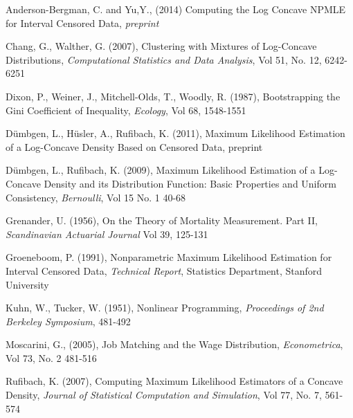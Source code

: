 \documentclass[11pt]{article}
\numberwithin{equation}{section}
\begin{document}
\vspace{3mm}

Anderson-Bergman, C. and Yu,Y.,  (2014) Computing the Log Concave NPMLE for Interval Censored Data, \emph{preprint}

\vspace{3mm}


Chang, G., Walther, G. (2007), Clustering with Mixtures of Log-Concave Distributions, \emph{Computational Statistics and Data Analysis}, Vol 51, No. 12, 6242-6251

\vspace{3mm}

Dixon, P., Weiner, J., Mitchell-Olds, T., Woodly, R. (1987), Bootstrapping the Gini Coefficient of Inequality, \emph{Ecology}, Vol 68, 1548-1551

\vspace{3mm}

D\"umbgen, L., H\"usler, A., Rufibach, K. (2011), Maximum Likelihood Estimation of a Log-Concave Density Based on Censored Data, preprint

\vspace{3mm}

D\"umbgen, L., Rufibach, K. (2009), Maximum Likelihood Estimation of a Log-Concave Density and its Distribution Function: Basic Properties and Uniform Consistency, \emph{Bernoulli}, Vol 15 No. 1 40-68

\vspace{3mm}

Grenander, U. (1956), On the Theory of Mortality Measurement. Part II, \emph{Scandinavian Actuarial Journal} Vol 39, 125-131

\vspace{3mm}

Groeneboom, P. (1991), Nonparametric Maximum Likelihood Estimation for Interval Censored Data, \emph{Technical Report}, Statistics Department, Stanford University

\vspace{3mm}

Kuhn, W., Tucker, W. (1951), Nonlinear Programming, \emph{Proceedings of 2nd Berkeley Symposium}, 481-492

\vspace{3mm}

Moscarini, G., (2005), Job Matching and the Wage Distribution, \emph{Econometrica}, Vol 73, No. 2 481-516

\vspace{3mm}

Rufibach, K. (2007), Computing Maximum Likelihood Estimators of a Concave Density, \emph{Journal of Statistical Computation and Simulation}, Vol 77, No. 7, 561-574
\end{document}
